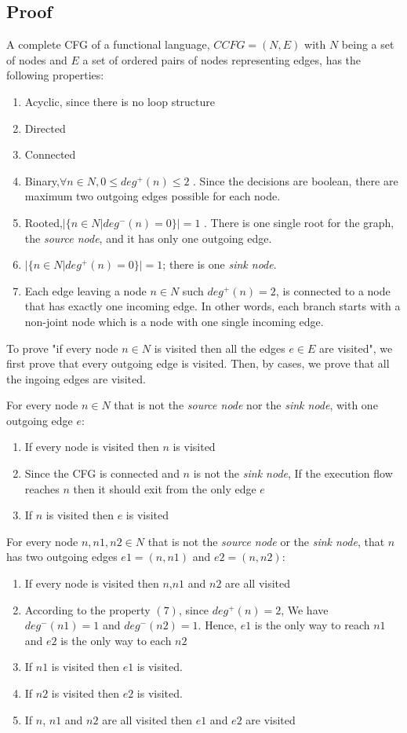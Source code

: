 \subsection{Proof}
A complete CFG of a functional language, $CCFG = (N,E)$ with $N$ being a set of nodes and $E$ a set of ordered pairs of nodes representing edges, has the following properties:

\begin{enumerate}
 \item Acyclic, since there is no loop structure
 \item Directed
 \item Connected
 \item Binary,$\forall n \in N, 0\leq deg^+(n)\leq2 $ . Since the decisions are boolean, there are maximum two outgoing edges possible for each node.
 \item Rooted,$|\{n\in N |deg^-(n)=0\} | = 1$ . There is one single root for the graph, the \emph{source node}, and it has only one outgoing edge.
 \item $|\{n\in N |deg^+(n)=0\} | = 1$; there is one \emph{sink node}.
 \item Each edge leaving a node $n \in N$ such $deg^+(n)=2$, is connected to a node that has exactly one incoming edge. In other words, each branch starts with a non-joint node which is a node with one single incoming edge.
\end{enumerate}

To prove "if every node $n \in N$ is visited then all the edges $e \in E$ are visited", we first prove that every outgoing edge is visited. Then, by cases, we prove that all the ingoing edges are visited.

For every node $n \in N$ that is not the \emph{source node} nor the \emph{sink node}, with one outgoing edge $e$:
\begin{enumerate}
 \item If every node is visited then $n$ is visited 
 \item Since the CFG is connected and $n$ is not the \emph{sink node}, If the execution flow reaches $n$ then it should exit from the only edge $e$
 \item If $n$ is visited then $e$ is visited
\end{enumerate}

For every node $n,n1,n2 \in N$ that is not the \emph{source node} or the \emph{sink node}, that $n$ has two outgoing edges $e1=(n,n1)$ and $e2=(n,n2)$:
\begin{enumerate}
 \item If every node is visited then $n$,$n1$ and $n2$ are all visited 
 \item According to the property $(7)$, since $deg^+(n)=2$, We have $deg^-(n1)=1$ and $deg^-(n2)=1$. Hence, $e1$ is the only way to reach $n1$ and $e2$ is the only way to each $n2$
 \item If $n1$ is visited then $e1$ is visited.
 \item If $n2$ is visited then $e2$ is visited.
 \item If $n$, $n1$ and $n2$ are all visited then $e1$ and $e2$ are visited
\end{enumerate}

